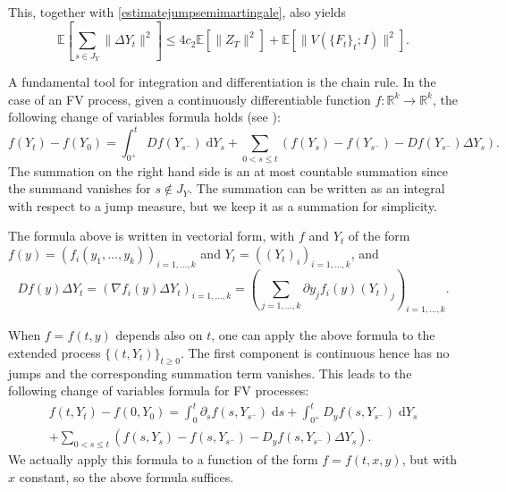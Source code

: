 \documentclass[reqno,12pt]{amsart}
\theoremstyle{plain} %
\theoremstyle{definition} %
\begin{document}
This, together with \eqref{estimatejumpsemimartingale}, also yields
\begin{equation}
    \label{expectationsquaredjumps}
    \mathbb{E}\left[\sum_{s\in J_{Y}} \|\Delta Y_t\|^2 \right] \leq 4c_2\mathbb{E}\left[\|Z_T\|^2\right] + \mathbb{E}\left[\|V(\{F_t\}_t; I)\|^2\right].
\end{equation}

A fundamental tool for integration and differentiation is the chain rule. In the case of an FV process, given a continuously differentiable function $f:\mathbb{R}^k \rightarrow \mathbb{R}^k$, the following change of variables formula holds (see \cite[Theorems II.31 and II.33]{Protter2005}):
\begin{equation}
    f(Y_t) - f(Y_0) = \int_{0^+}^t Df(Y_{s^-}) \;\mathrm{d}Y_s + \sum_{0 < s \leq t} \left( f(Y_s) - f(Y_{s^{-}}) - Df(Y_{s^-})\Delta Y_s\right).
\end{equation}
The summation on the right hand side is an at most countable summation since the summand vanishes for $s \notin J_{Y}$. The summation can be written as an integral with respect to a jump measure, but we keep it as a summation for simplicity.

The formula above is written in vectorial form, with $f$ and $Y_t$ of the form $f(y)=(f_i(y_1, \ldots, y_k))_{i=1, \ldots, k}$ and $Y_t = ((Y_t)_i)_{i=1, \ldots, k}$, and
\[
    Df(y)\Delta Y_t = \left( \nabla f_i(y)\Delta Y_t\right)_{i=1, \ldots, k} = \left( \sum_{j=1, \ldots, k} \partial y_j f_i(y) (Y_t)_j \right)_{i=1, \ldots, k}.
\]

When $f=f(t, y)$ depends also on $t$, one can apply the above formula to the extended process $\{(t, Y_t)\}_{t\geq 0}$. The first component is continuous hence has no jumps and the corresponding summation term vanishes. This leads to the following change of variables formula for FV processes:
\begin{multline}
    \label{changeofvariablesformulacadlagfv}
    f(t, Y_t) - f(0, Y_0) = \int_0^t \partial_s f(s, Y_{s^-})\;\mathrm{d}s + \int_{0^+}^t D_y f(s, Y_{s^-}) \;\mathrm{d}Y_s \\
    + \sum_{0 < s \leq t} \left( f(s, Y_s) - f(s, Y_{s^{-}}) - D_y f(s, Y_{s^-})\Delta Y_s\right).
\end{multline}
We actually apply this formula to a function of the form $f=f(t, x, y)$, but with $x$ constant, so the above formula suffices.
\end{document}
